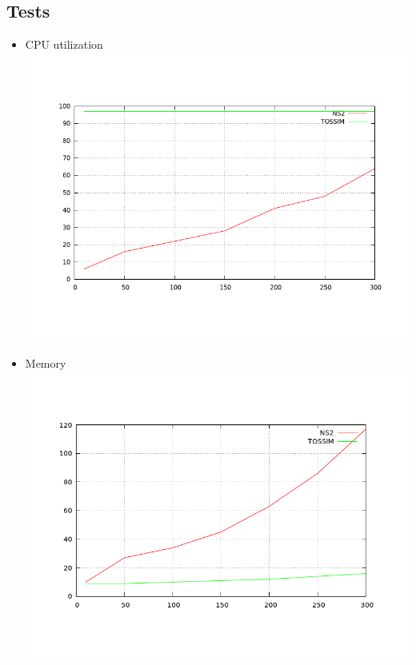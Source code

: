 \subsection{Tests}
\begin{itemize}
    \item{CPU utilization}
	\includegraphics[scale=0.35]{img/cpu.png}
    \item{Memory}
	\includegraphics[scale=0.35]{img/mem.png}
\end{itemize}
